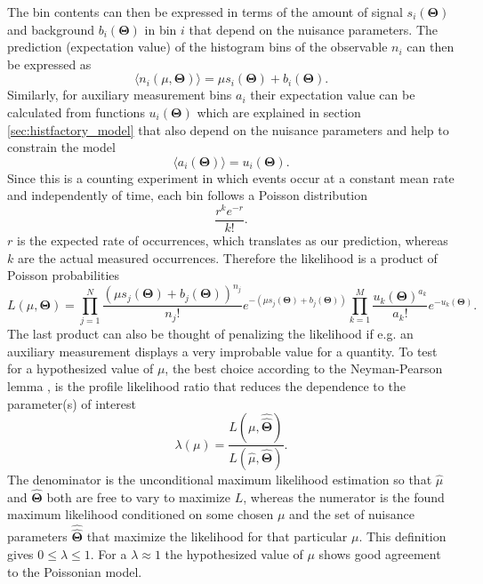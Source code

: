 The bin contents can then be expressed in terms of the amount of signal $s_i(\bm{\Theta})$ and background $b_i(\bm{\Theta})$ in bin $i$ that depend on the nuisance parameters. The prediction (expectation value) of the histogram bins of the observable $n_i$ can then be expressed as 
\begin{equation} \label{eq:n_i}
    \langle n_i(\mu,\bm{\Theta})\rangle = \mu s_i(\bm{\Theta}) +b_i(\bm{\Theta}). 
\end{equation}
Similarly, for auxiliary measurement bins $a_i$ their expectation value can be calculated from functions $u_i(\bm{\Theta})$ which are explained in section \ref{sec:histfactory_model} that also depend on the nuisance parameters and help to constrain the model
\begin{equation} \label{eq:a_i}
    \langle a_i(\bm{\Theta}) \rangle = u_i(\bm{\Theta}).
\end{equation}
Since this is a counting experiment in which events occur at a constant mean rate and independently of time, each bin follows a Poisson distribution
\begin{equation}\label{eq:poisson}
    \frac{r^k e^{-r}}{k!}.
\end{equation}
$r$ is the expected rate of occurrences, which translates as our prediction, whereas $k$ are the actual measured occurrences. Therefore the likelihood is a product of Poisson probabilities
\begin{equation}\label{eq:likelihood}
    L(\mu,\bm{\Theta})=
    \prod_{j=1}^N \frac{(\mu s_j(\bm{\Theta}) + b_j(\bm{\Theta}))^{n_j}}{n_j !} e^{-(\mu s_j(\bm{\Theta}) + b_j(\bm{\Theta}))}
    \prod_{k=1}^M \frac{u_k(\bm{\Theta})^{a_k}}{a_k!} e^{-u_k(\bm{\Theta})}.
\end{equation}
The last product can also be thought of penalizing the likelihood if e.g. an auxiliary measurement displays a very improbable value for a quantity. To test for a hypothesized value of $\mu$, the best choice according to the Neyman-Pearson lemma \citep{behnke2013data}, is the profile likelihood ratio that reduces the dependence to the parameter(s) of interest
\begin{equation}\label{eq:likelihood_ratio}
\lambda(\mu)=
    \frac{L(\mu,\hat{\hat{\bm{\Theta}}})}
    {L(\hat{\mu},\hat{\bm{\Theta}})}.
\end{equation}
The denominator is the unconditional maximum likelihood estimation so that $\hat{\mu}$ and $\hat{\bm{\Theta}}$ both are free to vary to maximize $L$, whereas the numerator is the found maximum likelihood conditioned on some chosen $\mu$ and the set of nuisance parameters $\hat{\hat{\bm{\Theta}}}$ that maximize the likelihood for that particular $\mu$. This definition gives $0 \leq \lambda \leq 1$. For a $\lambda \approx 1$ the hypothesized value of $\mu$ shows good agreement to the Poissonian model.

